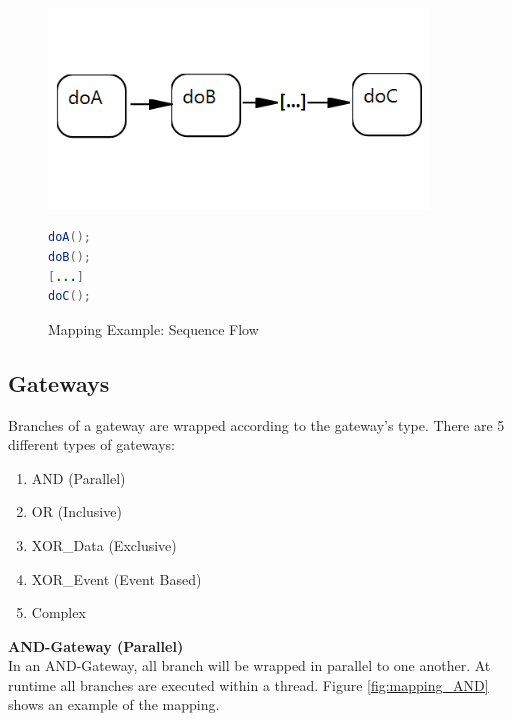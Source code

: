 \begin{figure}[h]
\begin{minipage}[c]{0.5\textwidth}
\includegraphics[width=0.9\textwidth]{images/mapping/sequence.png}
\end{minipage}
\begin{minipage}[c]{0.5\textwidth}
\begin{lstlisting}[language=Java]
doA();
doB();
[...]
doC();
\end{lstlisting}
\end{minipage}
\caption{Mapping Example: Sequence Flow}%
\label{fig:mapping_sequence}%
\end{figure}

\subsection{Gateways}
Branches of a gateway are wrapped according to the gateway's type. There are 5 different types of gateways:
\begin{enumerate}
	\item AND (Parallel)
	\item OR (Inclusive)
	\item XOR\_Data (Exclusive)
	\item XOR\_Event (Event Based)
	\item Complex 
\end{enumerate}

\textbf{AND-Gateway (Parallel)}\\
In an AND-Gateway, all branch will be wrapped in parallel to one another. At runtime all branches are executed within a thread. 
Figure \ref{fig:mapping_AND} shows an example of the mapping. \\

